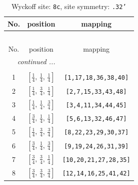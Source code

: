 \documentclass[fleqn,8pt]{jsarticle}
\begin{document}
\renewcommand{\arraystretch}{1.2}
\begin{longtable}{ccc}
\caption{Wyckoff site: {\tt 8c}, site symmetry: {\tt .32'}}
 \\
 \hline \hline
No. & position & mapping \\ \hline \endfirsthead

\multicolumn{2}{l}{\tablename\ \thetable{}} \\
 \hline \hline
No. & position & mapping \\ \hline \endhead

 \hline \hline
\multicolumn{2}{r}{\footnotesize\it continued ...} \\ \endfoot

 \hline \hline
\multicolumn{2}{r}{} \\ \endlastfoot

1 & $\left[ \frac{1}{4},\, \frac{1}{4},\, \frac{1}{4} \right]$ & {\tt [1,17,18,36,38,40]} \\ \hline
2 & $\left[ \frac{1}{4},\, \frac{3}{4},\, \frac{1}{4} \right]$ & {\tt [2,7,15,33,43,48]} \\ \hline
3 & $\left[ \frac{1}{4},\, \frac{1}{4},\, \frac{3}{4} \right]$ & {\tt [3,4,11,34,44,45]} \\ \hline
4 & $\left[ \frac{3}{4},\, \frac{1}{4},\, \frac{1}{4} \right]$ & {\tt [5,6,13,32,46,47]} \\ \hline
5 & $\left[ \frac{1}{4},\, \frac{3}{4},\, \frac{3}{4} \right]$ & {\tt [8,22,23,29,30,37]} \\ \hline
6 & $\left[ \frac{3}{4},\, \frac{1}{4},\, \frac{3}{4} \right]$ & {\tt [9,19,24,26,31,39]} \\ \hline
7 & $\left[ \frac{3}{4},\, \frac{3}{4},\, \frac{1}{4} \right]$ & {\tt [10,20,21,27,28,35]} \\ \hline
8 & $\left[ \frac{3}{4},\, \frac{3}{4},\, \frac{3}{4} \right]$ & {\tt [12,14,16,25,41,42]} \\
\end{longtable}
\renewcommand{\arraystretch}{1.2}
\end{document}
